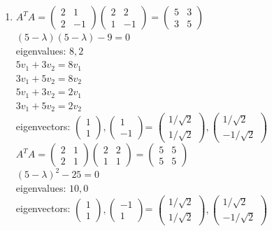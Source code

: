 \documentclass[11pt]{article}
\begin{document}
\begin{enumerate}
\item
	$A^TA = \begin{pmatrix} 2 & 1 \\ 2 & -1 \end{pmatrix} \begin{pmatrix} 2 & 2 \\ 1 & -1 \end{pmatrix} = \begin{pmatrix} 5&3 \\ 3&5 \end{pmatrix}$\\
	$(5-\lambda)(5-\lambda)-9 = 0$\\
	eigenvalues: $8, 2$\\
	$5v_1+3v_2 = 8v_1$\\
	$3v_1+5v_2 = 8v_2$\\
	$5v_1+3v_2 = 2v_1$\\
	$3v_1+5v_2 = 2v_2$\\
	eigenvectors: $\begin{pmatrix} 1 \\ 1\end{pmatrix}, \begin{pmatrix} 1 \\ -1\end{pmatrix}$= $\begin{pmatrix} 1/\sqrt{2} \\ 1/\sqrt{2}\end{pmatrix}, \begin{pmatrix} 1/\sqrt{2} \\ -1/\sqrt{2}\end{pmatrix}$\\
	$A^TA = \begin{pmatrix} 2 & 1 \\ 2 & 1 \end{pmatrix} \begin{pmatrix} 2 & 2 \\ 1 & 1 \end{pmatrix} = \begin{pmatrix} 5&5 \\ 5&5 \end{pmatrix}$\\
	$(5-\lambda)^2 - 25=0$\\
	eigenvalues: $10, 0$\\
	eigenvectors: $\begin{pmatrix} 1 \\ 1\end{pmatrix}, \begin{pmatrix} -1 \\ 1\end{pmatrix}$= $\begin{pmatrix} 1/\sqrt{2} \\ 1/\sqrt{2}\end{pmatrix}, \begin{pmatrix} 1/\sqrt{2} \\ -1/\sqrt{2}\end{pmatrix}$\\
	

\end{enumerate}
\end{document}
